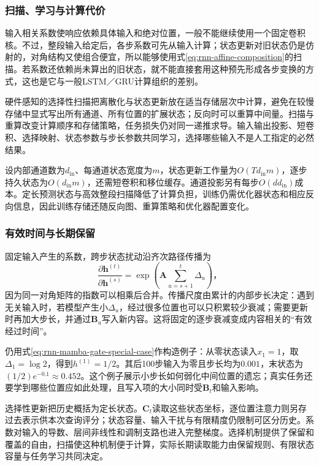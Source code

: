\subsubsection{扫描、学习与计算代价}
\label{sec:rnn-mamba-scan}

输入相关系数使响应依赖具体输入和绝对位置，一般不能继续使用一个固定卷积核。不过，整段输入给定后，各步系数可先从输入计算；状态更新对旧状态仍是仿射的，对角结构又使组合便宜，所以能够使用式\eqref{eq:rnn-affine-composition}的扫描。若系数还依赖尚未算出的旧状态，就不能直接套用这种预先形成各步变换的方式，这也是它与一般LSTM／GRU计算组织的差别。

硬件感知的选择性扫描把离散化与状态更新放在适当存储层次中计算，避免在较慢存储中显式写出所有通道、所有位置的扩展状态；反向时可以重算中间量。扫描与重算改变计算顺序和存储策略，任务损失仍对同一递推求导。输入输出投影、短卷积、选择映射、状态参数与步长参数共同学习，选择哪些输入不是人工指定的必然结果。

设内部通道数为$d_{\mathrm{in}}$、每通道状态宽度为$m$，状态更新工作量为$O(Td_{\mathrm{in}}m)$，逐步持久状态为$O(d_{\mathrm{in}}m)$，还需短卷积和移位缓存。通道投影另有每步$O(dd_{\mathrm{in}})$成本。定长预测状态与高效整段扫描降低了计算负担，训练仍需优化器状态和相应反向信息，因此训练存储还随反向图、重算策略和优化器配置变化。

\subsubsection{有效时间与长期保留}
\label{sec:rnn-mamba-long-memory}

固定输入产生的系数，跨步状态扰动沿齐次路径传播为
\begin{equation}
  \frac{\partial\bm h^{(t)}}{\partial\bm h^{(s)}}
    =\exp\!\left(\bm A\sum_{u=s+1}^{t}\Delta_u\right)\text{，}
  \label{eq:rnn-mamba-memory-product}
\end{equation}
因为同一对角矩阵的指数可以相乘后合并。传播尺度由累计的内部步长决定：遇到无关输入时，若模型产生小$\Delta_u$，经过很多位置也可以只积累较少衰减；需要更新时再加大步长，并通过$\bm B_u$写入新内容。这将固定的逐步衰减变成内容相关的“有效经过时间”。

仍用式\eqref{eq:rnn-mamba-gate-special-case}作构造例子：从零状态读入$x_1=1$，取$\Delta_1=\log2$，得到$h^{(1)}=1/2$。其后100步输入为零且步长均为$0.001$，末状态为$(1/2)e^{-0.1}\approx0.452$。这个例子展示小步长如何弱化中间位置的遗忘；真实任务还要学到哪些位置应如此处理，且写入项的大小同时受$\bm B_t$和输入影响。

选择性更新把历史概括为定长状态。$\bm C_t$读取这些状态坐标，逐位置注意力则另存过去表示供本次查询评分；状态容量、输入干扰与有限精度仍限制可区分历史。系数对输入的导数、层间非线性和调制支路也进入完整梯度。选择机制提供了保留和覆盖的自由，扫描使这种机制便于计算，实际长期读取能力由保留规则、有限状态容量与任务学习共同决定。

